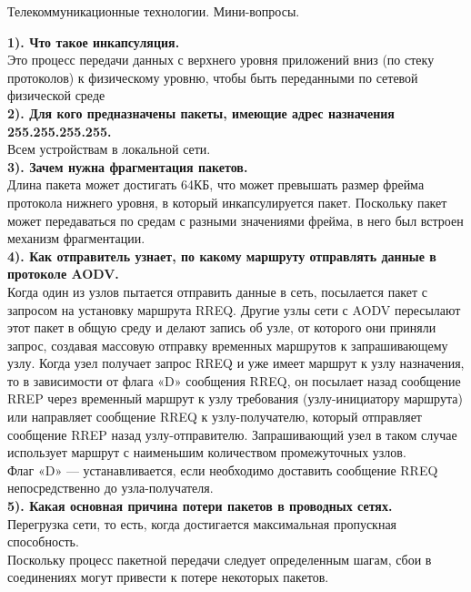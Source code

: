 \documentclass[11pt,a4paper]{article}
\author{OFFLUCK}
\begin{document}
\begin{center}
    \begin{huge}
        \textsf{Телекоммуникационные технологии. Мини-вопросы.}
    \end{huge}
\end{center}

\textbf{1). Что такое инкапсуляция.}
\\
Это процесс передачи данных с верхнего уровня приложений вниз (по стеку протоколов) к физическому уровню, чтобы быть переданными по сетевой физической среде
\\
\textbf{2). Для кого предназначены пакеты, имеющие адрес назначения 255.255.255.255.}
\\
Всем устройствам в локальной сети.
\\
\textbf{3). Зачем нужна фрагментация пакетов.}
\\
Длина пакета может достигать 64КБ, что может превышать размер фрейма протокола нижнего уровня, в который инкапсулируется пакет. Поскольку пакет может передаваться по средам с разными значениями фрейма, в него был встроен механизм фрагментации.
\\
\textbf{4). Как отправитель узнает, по какому маршруту отправлять данные в протоколе AODV.}
\\
Когда один из узлов пытается отправить данные в сеть, посылается пакет с запросом на установку маршрута RREQ. Другие узлы сети с AODV пересылают этот пакет в общую среду и делают запись об узле, от которого они приняли запрос, создавая массовую отправку временных маршрутов к запрашивающему узлу. Когда узел получает запрос RREQ и уже имеет маршрут к узлу назначения, то в зависимости от флага «D» сообщения RREQ, он посылает назад сообщение RREP через временный маршрут к узлу требования (узлу-инициатору маршрута) или направляет сообщение RREQ к узлу-получателю, который отправляет сообщение RREP назад узлу-отправителю. Запрашивающий узел в таком случае использует маршрут с наименьшим количеством промежуточных узлов.
\\
Флаг «D» — устанавливается, если необходимо доставить сообщение RREQ непосредственно до узла-получателя.
\\
\textbf{5). Какая основная причина потери пакетов в проводных сетях. 
}
\\
Перегрузка сети, то есть, когда достигается максимальная пропускная способность.
\\
Поскольку процесс пакетной передачи следует определенным шагам, сбои в соединениях могут привести к потере некоторых пакетов.
\end{document}
